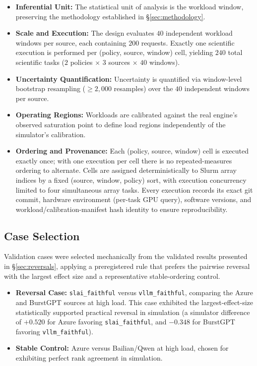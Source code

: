 \documentclass[sn-basic,Numbered,pdflatex]{sn-jnl}
\begin{document}
\begin{itemize}
  \item \textbf{Inferential Unit:} The statistical unit of analysis is the workload window, preserving the methodology established in \S\ref{sec:methodology}.
  \item \textbf{Scale and Execution:} The design evaluates $40$ independent workload windows per source, each containing $200$ requests. Exactly one scientific execution is performed per (policy, source, window) cell, yielding $240$ total scientific tasks ($2$ policies $\times$ $3$ sources $\times$ $40$ windows).
  \item \textbf{Uncertainty Quantification:} Uncertainty is quantified via window-level bootstrap resampling ($\ge 2{,}000$ resamples) over the $40$ independent windows per source.
  \item \textbf{Operating Regions:} Workloads are calibrated against the real engine's observed saturation point to define load regions independently of the simulator's calibration.
  \item \textbf{Ordering and Provenance:} Each (policy, source, window) cell is executed exactly once; with one execution per cell there is no repeated-measures ordering to alternate. Cells are assigned deterministically to Slurm array indices by a fixed (source, window, policy) sort, with execution concurrency limited to four simultaneous array tasks. Every execution records its exact git commit, hardware environment (per-task GPU query), software versions, and workload/calibration-manifest hash identity to ensure reproducibility.
\end{itemize}

\subsection{Case Selection}
\label{sec:real-system-case-selection}

Validation cases were selected mechanically from the validated results presented in \S\ref{sec:reversals}, applying a preregistered rule that prefers the pairwise reversal with the largest effect size and a representative stable-ordering control.

\begin{itemize}
  \item \textbf{Reversal Case:} \texttt{slai\_faithful} versus \texttt{vllm\_faithful}, comparing the Azure and BurstGPT sources at high load. This case exhibited the largest-effect-size statistically supported practical reversal in simulation (a simulator difference of $+0.520$ for Azure favoring \texttt{slai\_faithful}, and $-0.348$ for BurstGPT favoring \texttt{vllm\_faithful}).
  \item \textbf{Stable Control:} Azure versus Bailian/Qwen at high load, chosen for exhibiting perfect rank agreement in simulation.
\end{itemize}
\end{document}
